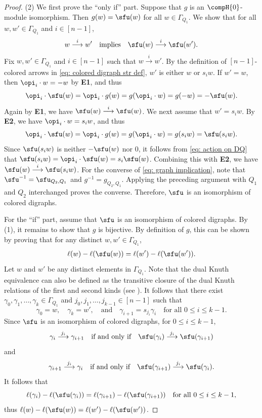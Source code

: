 \documentclass[12pt, reqno]{amsart}
\theoremstyle{plain}
\theoremstyle{definition}
\numberwithin{equation}{section}
\numberwithin{figure}{section}
\numberwithin{table}{section}
\begin{document}
\begin{proof}
(2)
We first prove the ``only if'' part.
Suppose that $g$ is an $\compH{0}$-module isomorphism.
Then $g(w)=\sfu(w)$ for all $w\in\Gamma_{Q_1}$.
We show that  for all $w,w' \in \Gamma_{Q_1}$ and $i \in [n-1]$,
\begin{align}\label{eq: graph implication}
w \overset{i}{\longrightarrow} w' 
\quad \text{implies} \quad
\sfu(w) \overset{i}{\longrightarrow} \sfu(w').
\end{align}
Fix $w,w' \in \Gamma_{Q_1}$ and $i \in [n-1]$ such that $w \overset{i}{\longrightarrow} w'$.
By the definition of $[n-1]$-colored arrows in \cref{eq: colored digraph str def}, $w'$ is either $w$ or $s_i w$.
If $w' = w$, then $\opi_i \cdot w = -w$ by \textbf{E1}, and thus
\[
\opi_i \cdot \sfu(w) = \opi_i \cdot g(w) = g(\opi_i \cdot w) = g(-w) = -\sfu(w).
\]
Again by \textbf{E1}, we have $\sfu(w) \overset{i}{\longrightarrow} \sfu(w)$.
We next assume that $w' = s_i w$.
By \textbf{E2}, we have $\opi_i \cdot w = s_i w$, and thus 
\[
\opi_i \cdot \sfu(w) = \opi_i \cdot g(w) =  g(\opi_i \cdot w) = g(s_i w) = \sfu(s_i w).
\]
Since $\sfu(s_i w)$ is neither $-\sfu(w)$ nor $0$, it follows from \cref{eq: action on DQ} that $\sfu(s_i w) = \opi_i \cdot \sfu(w) = s_i \sfu(w)$.
Combining this with  \textbf{E2}, we have $\sfu(w) \overset{i}{\longrightarrow} \sfu(s_i w)$.
For the converse of \cref{eq: graph implication}, note that
$\sfu^{-1}=\sfu_{Q_2,Q_1}$ and $g^{-1}=g_{Q_2,Q_1}$.
Applying the preceding argument with $Q_1$ and $Q_2$ interchanged proves the converse. 
Therefore, $\sfu$ is an isomorphism of colored digraphs.

For the ``if''  part, assume that $\sfu$ is an isomorphism of colored digraphs.
By (1), it remains to show that $g$ is bijective.
By definition of $g$, this can be shown by proving that for any distinct $w, w' \in \Gamma_{Q_1}$, 
\begin{align*}
\ell(w) - \ell(\sfu(w)) = \ell(w') - \ell(\sfu(w')).
\end{align*}
Let $w$ and $w'$ be any distinct elements in $\Gamma_{Q_1}$.
Note that the dual Knuth equivalence can also be defined as the transitive closure of the dual Knuth relations of the first and second kinds (see \cite[Definition 3.6.8]{91Sag}).
It follows that there exist $\gamma_0, \gamma_1, \ldots, \gamma_k \in \Gamma_{Q_1}$ 
and $j_0, j_1, \ldots, j_{k-1} \in [n-1]$ such that
\[
\gamma_0=w, \quad
\gamma_k=w', \quad \text{and} \quad
\gamma_{i+1}=s_{j_i}\gamma_i
\quad \text{for all $0\leq i\leq k-1$.}
\]
Since $\sfu$ is an isomorphism of colored digraphs, for $0 \le i \leq k-1$,
\[
\gamma_i \overset{j_i}{\longrightarrow}\gamma_{i+1}
\quad \text{if and only if} \quad
\sfu(\gamma_i) \overset{j_i}{\longrightarrow} \sfu(\gamma_{i+1})
\]
and
\[
\gamma_{i+1} \overset{j_i}{\longrightarrow}\gamma_{i}\quad \text{if and only if} \quad
\sfu(\gamma_{i+1}) \overset{j_i}{\longrightarrow} \sfu(\gamma_{i}).
\]
It follows that 
\[
\ell(\gamma_i)-\ell(\sfu(\gamma_i)) = \ell(\gamma_{i+1})-\ell(\sfu(\gamma_{i+1})) 
\quad \text{for all $0\leq i\leq k-1$,}
\]
thus
$\ell(w) - \ell(\sfu(w)) = \ell(w') - \ell(\sfu(w'))$. 
\end{proof}
\end{document}
